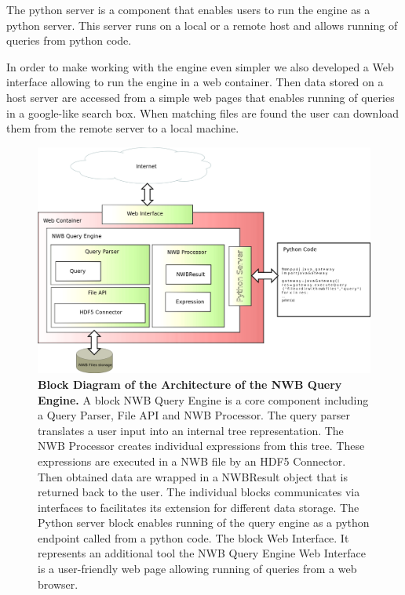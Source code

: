 \documentclass[utf8]{frontiersSCNS} %
\begin{document}
The python server is a component that enables users to run the engine as a python server. This server runs on a local or a remote host and allows running of queries from python code.

In order to make working with the engine even simpler we also developed a Web interface allowing to run the engine in a web container. Then data stored on a host server are accessed from a simple web pages that enables running of queries in a google-like search box. When matching files are found the user can download them from the remote server to a local machine.

\begin{figure}
  \includegraphics[width=17cm]{architecture}
\caption{\textbf{Block Diagram of the Architecture of the NWB Query Engine. } A block NWB Query Engine is a core component including a Query Parser, File API and NWB Processor. The query parser translates a user input into an internal tree representation. The NWB Processor creates individual expressions from this tree. These expressions are executed in a NWB file by an HDF5 Connector. Then obtained data are wrapped in a NWBResult object that is returned back to the user. The individual blocks communicates via interfaces to facilitates its extension for different data storage. The Python server block enables running of the query engine as a python endpoint called from a python code. The block Web Interface. It represents an additional tool the NWB Query Engine Web Interface is a user-friendly web page allowing running of queries from a web browser.}
\label{fig:architecture}
\end{figure}
\end{document}
